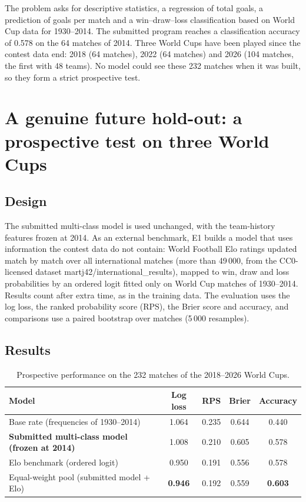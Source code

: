 The problem asks for descriptive statistics, a regression of total goals, a prediction of goals per match and a win--draw--loss classification based on World Cup data for 1930--2014. The submitted program reaches a classification accuracy of 0.578 on the 64 matches of 2014. Three World Cups have been played since the contest data end: 2018 (64 matches), 2022 (64 matches) and 2026 (104 matches, the first with 48 teams). No model could see these 232 matches when it was built, so they form a strict prospective test.

\section{A genuine future hold-out: a prospective test on three World Cups}

\subsection{Design}
The submitted multi-class model is used unchanged, with the team-history features frozen at 2014. As an external benchmark, E1 builds a model that uses information the contest data do not contain: World Football Elo ratings updated match by match over all international matches (more than 49\,000, from the CC0-licensed dataset martj42/international\_results\cite{martj42}), mapped to win, draw and loss probabilities by an ordered logit fitted only on World Cup matches of 1930--2014. Results count after extra time, as in the training data. The evaluation uses the log loss, the ranked probability score (RPS), the Brier score and accuracy, and comparisons use a paired bootstrap over matches (5\,000 resamples).

\subsection{Results}
\begin{table}[htbp]\centering\small
\caption{Prospective performance on the 232 matches of the 2018--2026 World Cups.}\label{tab:wc-e1}
\begin{tabular}{lcccc}\toprule
Model & Log loss & RPS & Brier & Accuracy\\\midrule
Base rate (frequencies of 1930--2014) & 1.064 & 0.235 & 0.644 & 0.440\\
\textbf{Submitted multi-class model (frozen at 2014)} & 1.008 & 0.210 & 0.605 & 0.578\\
Elo benchmark (ordered logit) & 0.950 & 0.191 & 0.556 & 0.578\\
Equal-weight pool (submitted model + Elo) & \textbf{0.946} & 0.192 & 0.559 & \textbf{0.603}\\\bottomrule
\end{tabular}
\end{table}

